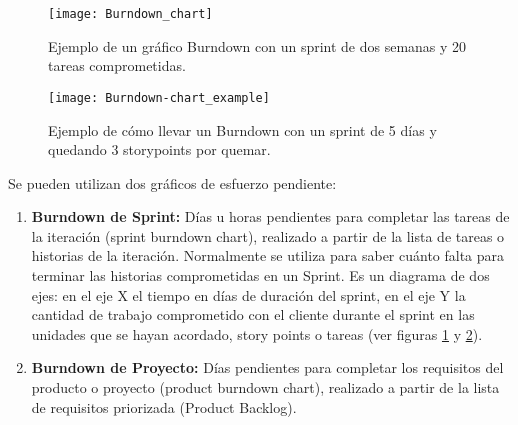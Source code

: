 \begin{figure}[h]
  \centering
  \texttt{[image: Burndown\_chart]}
  \caption{Ejemplo de un gráfico Burndown con un sprint de dos semanas y 20 tareas comprometidas.}
  \centering
  \label{fig:Burndown_chart} %
\end{figure}
\FloatBarrier %

\begin{figure}[h]
  \centering
  \texttt{[image: Burndown-chart\_example]}
  \caption{Ejemplo de cómo llevar un Burndown con un sprint de 5 días y quedando 3 storypoints por quemar.}
  \centering
  \label{fig:Burndown-chart_example} %
\end{figure}
\FloatBarrier %

Se pueden utilizan dos gráficos de esfuerzo pendiente:

\begin{enumerate}

\item \textbf{Burndown de Sprint:} Días u horas pendientes para completar las tareas de la iteración (sprint burndown chart), realizado a partir de la lista de tareas o historias de la iteración. Normalmente se utiliza para saber cuánto falta para terminar las historias comprometidas en un Sprint. Es un diagrama de dos ejes: en el eje X el tiempo en días de duración del sprint, en el eje Y la cantidad de trabajo comprometido con el cliente durante el sprint en las unidades que se hayan acordado, story points o tareas (ver figuras \ref{fig:Burndown_chart} y \ref{fig:Burndown-chart_example}).

\item \textbf{Burndown de Proyecto:} Días pendientes para completar los requisitos del producto o proyecto (product burndown chart), realizado a partir de la lista de requisitos priorizada (Product Backlog).

\end{enumerate}

